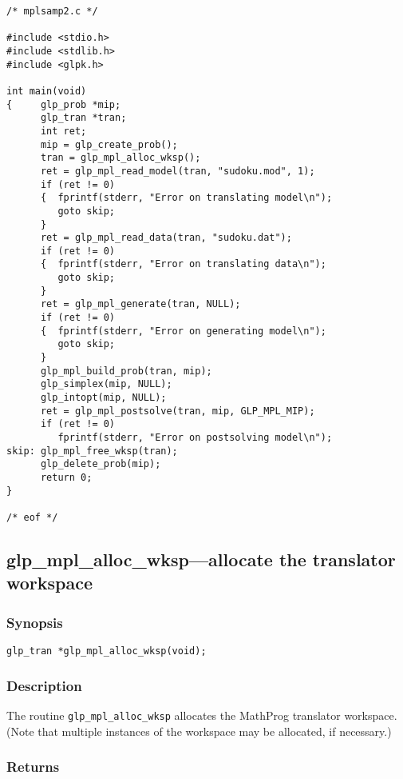 \begin{small}
\begin{verbatim}
/* mplsamp2.c */

#include <stdio.h>
#include <stdlib.h>
#include <glpk.h>

int main(void)
{     glp_prob *mip;
      glp_tran *tran;
      int ret;
      mip = glp_create_prob();
      tran = glp_mpl_alloc_wksp();
      ret = glp_mpl_read_model(tran, "sudoku.mod", 1);
      if (ret != 0)
      {  fprintf(stderr, "Error on translating model\n");
         goto skip;
      }
      ret = glp_mpl_read_data(tran, "sudoku.dat");
      if (ret != 0)
      {  fprintf(stderr, "Error on translating data\n");
         goto skip;
      }
      ret = glp_mpl_generate(tran, NULL);
      if (ret != 0)
      {  fprintf(stderr, "Error on generating model\n");
         goto skip;
      }
      glp_mpl_build_prob(tran, mip);
      glp_simplex(mip, NULL);
      glp_intopt(mip, NULL);
      ret = glp_mpl_postsolve(tran, mip, GLP_MPL_MIP);
      if (ret != 0)
         fprintf(stderr, "Error on postsolving model\n");
skip: glp_mpl_free_wksp(tran);
      glp_delete_prob(mip);
      return 0;
}

/* eof */
\end{verbatim}
\end{small}

\subsection{glp\_mpl\_alloc\_wksp---allocate the translator workspace}

\subsubsection*{Synopsis}

\begin{verbatim}
glp_tran *glp_mpl_alloc_wksp(void);
\end{verbatim}

\subsubsection*{Description}

The routine \verb|glp_mpl_alloc_wksp| allocates the MathProg translator
work\-space. (Note that multiple instances of the workspace may be
allocated, if necessary.)

\subsubsection*{Returns}

